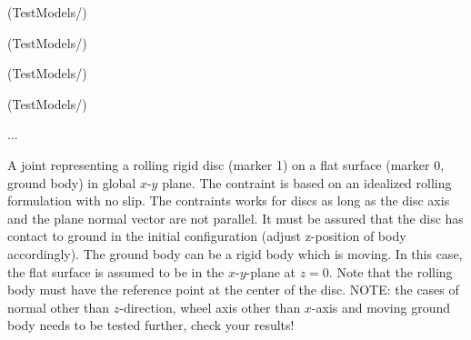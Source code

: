 \item {} (TestModels/)
\item {} (TestModels/)
\item {} (TestModels/)
\item {} (TestModels/)
\item  ...


\ei

%
\newpage


\label{sec:item:ObjectJointRollingDisc}
A joint representing a rolling rigid disc (marker 1) on a flat surface (marker 0, ground body) in global $x$-$y$ plane. The contraint is based on an idealized rolling formulation with no slip. The contraints works for discs as long as the disc axis and the plane normal vector are not parallel. It must be assured that the disc has contact to ground in the initial configuration (adjust z-position of body accordingly). The ground body can be a rigid body which is moving. In this case, the flat surface is assumed to be in the $x$-$y$-plane at $z=0$. Note that the rolling body must have the reference point at the center of the disc. NOTE: the cases of normal other than $z$-direction, wheel axis other than $x$-axis and moving ground body needs to be tested further, check your results!
\vspace{12pt}\\

